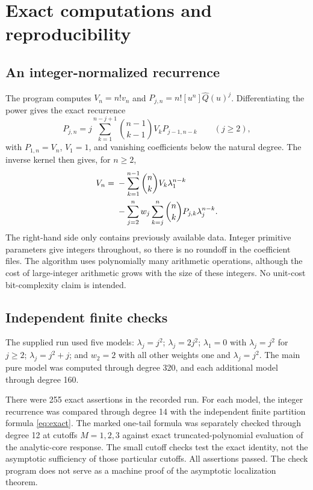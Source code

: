 \documentclass[11pt,a4paper]{article}
\numberwithin{equation}{section}
\theoremstyle{definition}\newtheorem{definition}[theorem]{Definition}
\theoremstyle{remark}\newtheorem{remark}[theorem]{Remark}
\theoremstyle{definition}
\newcommand{\Q}{\widehat Q}
\begin{document}
\section{Exact computations and reproducibility}
\label{sec:verification}

\subsection{An integer-normalized recurrence}
The program  computes
\(V_n=n!v_n\) and \(P_{j,n}=n![u^n]\Q(u)^j\). Differentiating the
power gives the exact recurrence
\begin{equation}
 P_{j,n}=j\sum_{k=1}^{n-j+1}\binom{n-1}{k-1}V_kP_{j-1,n-k}
 \qquad(j\ge2),
 \label{eq:powerrecurrence}
\end{equation}
with \(P_{1,n}=V_n\), \(V_1=1\), and vanishing coefficients below the
natural degree. The inverse kernel then gives, for \(n\ge2\),
\begin{align}
 V_n={}&-\sum_{k=1}^{n-1}\binom nk V_k\lambda_1^{n-k}\notag\\
 &-\sum_{j=2}^n w_j\sum_{k=j}^n
               \binom nk P_{j,k}\lambda_j^{n-k}.
 \label{eq:integerrecurrence}
\end{align}
The right-hand side only contains previously available data. Integer
primitive parameters give integers throughout, so there is no roundoff
in the coefficient files. The algorithm uses polynomially many arithmetic
operations, although the cost of large-integer arithmetic grows with the
size of these integers. No unit-cost bit-complexity claim is intended.

\subsection{Independent finite checks}
The supplied run used five models: \(\lambda_j=j^2\);
\(\lambda_j=2j^2\); \(\lambda_1=0\) with \(\lambda_j=j^2\) for
\(j\ge2\); \(\lambda_j=j^2+j\); and \(w_2=2\) with all other
weights one and \(\lambda_j=j^2\). The main pure model was computed
through degree 320, and each additional model through degree 160.

There were 255 exact assertions in the recorded run. For each model, the
integer recurrence was compared through degree 14 with the independent
finite partition formula \eqref{eq:exact}. The marked one-tail
formula was separately checked through degree 12 at cutoffs \(M=1,2,3\)
against exact truncated-polynomial evaluation of the analytic-core response.
The small cutoff checks test the exact identity, not the asymptotic
sufficiency of those particular cutoffs. All assertions passed.
The check program does not serve as a machine proof of the asymptotic
localization theorem.
\end{document}
